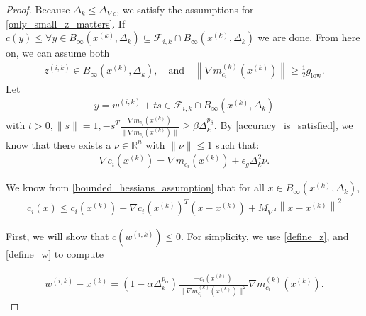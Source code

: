 \documentclass{article}
\theoremstyle{case}
\newcommand{\maxhessian}{{M_{\nabla^2}}}
\newcommand{\xk}{{x^{(k)}}}
\newcommand{\Rn}{\mathbb R^n}
\newcommand{\dk}{\Delta_k}
\newcommand{\zik}{{z^{(i, k)}}}
\newcommand{\fik}{{\mathcal F_{i, k}}}
\newcommand{\wik}{{w^{(i, k)}}}
\newcommand{\gmcik}{{\nabla m_{c_i}^{(k)}(\xk)}}
\newcommand{\hgik}{{\frac{\nabla m_{c_i}(\xk)}{\|\nabla m_{c_i}(\xk)\|}}}
\newcommand{\tr}{{ B_{\infty}\left(\xk, \dk\right) }}
\newcommand{\mingraddelta}{{\Delta_{\nabla c}}}
\newcommand{\mingrad}{{ g_{\text{low}} }}
\begin{document}
\begin{proof}

Because $\dk \le \mingraddelta$, we satisfy the assumptions for \cref{only_small_z_matters}.
If $c(y) \le \forall y \in \tr \subseteq \fik \cap \tr$ we are done.
From here on, we can assume both
\begin{align}
\zik \in \tr, \quad \textrm{and} \quad \left\|\gmcik\right\| \ge \frac 1 2 \mingrad. \label{z_is_active}
\end{align}
Let
\begin{align}
y = \wik + ts \in \fik \cap \tr \label{t_is_bounded}
\end{align}
with $t > 0, \|s\| = 1, -s^T\hgik \ge \beta \dk^{p_{\beta}}$.
By \cref{accuracy_is_satisfied}, we know that there exists a $\nu\in\Rn$ with $\|\nu\|\le 1$ such that:
\begin{align}
\nabla c_i(\xk) = \nabla m_{c_i}(\xk) + \epsilon_{g}\dk^2\nu. \label{model_error_for_gradient}
\end{align}

We know from \cref{bounded_hessians_assumption} that for all $x \in \tr$,
\begin{align}
c_i(x) \le c_i(\xk) + \nabla c_i(\xk)^T(x - \xk) + \maxhessian \left \|x - \xk \right\|^2 \label{constraint_lower_bound}
\end{align}

First, we will show that $c(\wik) \le 0$.
For simplicity, we use \cref{define_z}, and \cref{define_w} to compute


\begin{align}
\wik - \xk = \left(1 - \alpha \dk^{p_{\alpha} }\right)\frac{-c_i(\xk)}{\|\gmcik\|^2}\gmcik. \label{simple_computation}
\end{align}


\end{proof}
\end{document}
